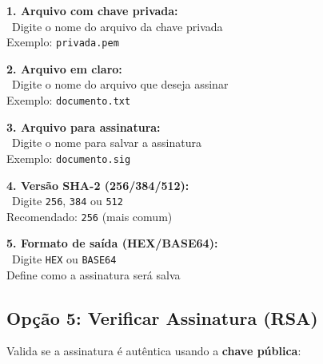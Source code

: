 \documentclass[12pt,a4paper]{article}
\begin{document}
\begin{tcolorbox}[colback=primaryblue!10,colframe=primaryblue,title={\faSignature\ Campos para Assinatura RSA}]

\textbf{1. Arquivo com chave privada:}\\
\quad \faLock\ Digite o nome do arquivo da chave privada\\
\quad Exemplo: \texttt{privada.pem}

\textbf{2. Arquivo em claro:}\\
\quad \faFileAlt\ Digite o nome do arquivo que deseja assinar\\
\quad Exemplo: \texttt{documento.txt}

\textbf{3. Arquivo para assinatura:}\\
\quad \faSave\ Digite o nome para salvar a assinatura\\
\quad Exemplo: \texttt{documento.sig}

\textbf{4. Versão SHA-2 (256/384/512):}\\
\quad \faHashtag\ Digite \texttt{256}, \texttt{384} ou \texttt{512}\\
\quad Recomendado: \texttt{256} (mais comum)

\textbf{5. Formato de saída (HEX/BASE64):}\\
\quad \faFileCode\ Digite \texttt{HEX} ou \texttt{BASE64}\\
\quad Define como a assinatura será salva

\end{tcolorbox}

\subsection{Opção 5: Verificar Assinatura (RSA)}

Valida se a assinatura é autêntica usando a \textbf{chave pública}:
\end{document}
